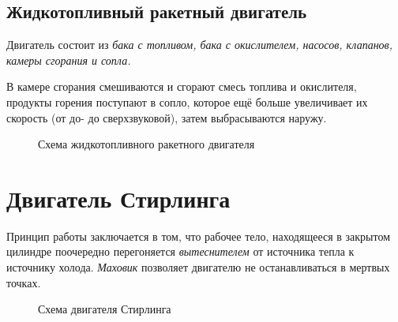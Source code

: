 \documentclass[a4paper,14pt]{article}
\begin{document}
    \subsection{Жидкотопливный ракетный двигатель}
        Двигатель состоит из \textit{бака с топливом, бака с окислителем, насосов, клапанов, камеры сгорания и сопла.}

        В камере сгорания смешиваются и сгорают смесь топлива и окислителя, продукты горения поступают в сопло, которое ещё больше увеличивает их скорость (от до- до сверхзвуковой), затем выбрасываются наружу.
    \begin{figure}[h]
        \caption{Схема жидкотопливного ракетного двигателя}
    \end{figure}

    \section{Двигатель Стирлинга}
        Принцип работы заключается в том, что рабочее тело, находящееся в закрытом цилиндре поочередно перегоняется \textit{вытеснителем} от источника тепла к источнику холода.
        \textit{Маховик} позволяет двигателю не останавливаться в мертвых точках.
        \begin{figure}[h]
            \caption{Схема двигателя Стирлинга}
        \end{figure}
\end{document}
